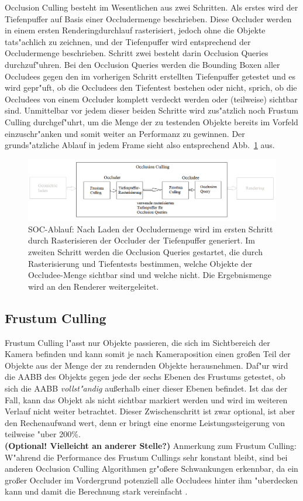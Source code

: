 \documentclass[journal]{vgtc}
\begin{document}
Occlusion Culling besteht im Wesentlichen aus zwei Schritten. Als erstes wird der Tiefenpuffer auf Basis einer Occludermenge beschrieben.
Diese Occluder werden in einem ersten Renderingdurchlauf rasterisiert, jedoch ohne die Objekte tats"achlich zu zeichnen, und der Tiefenpuffer wird entsprechend der Occludermenge beschrieben.
Schritt zwei besteht darin Occlusion Queries durchzuf"uhren.
Bei den Occlusion Queries werden die Bounding Boxen aller Occludees gegen den im vorherigen Schritt erstellten Tiefenpuffer getestet und es wird gepr"uft, ob die Occludees den Tiefentest bestehen oder nicht, sprich, ob die Occludees von einem Occluder komplett verdeckt werden oder (teilweise) sichtbar sind.
Unmittelbar vor jedem dieser beiden Schritte wird zus"atzlich noch Frustum Culling durchgef"uhrt, um die Menge der zu testenden Objekte bereits im Vorfeld einzuschr"anken und somit weiter an Performanz zu gewinnen.
Der grunds"atzliche Ablauf in jedem Frame sieht also entsprechend Abb.\ \ref{fig:socablauf} aus.
\begin{figure}%
\includegraphics[width=\columnwidth]{images/SOCAblauf3.png}%
\caption{SOC-Ablauf: Nach Laden der Occludermenge wird im ersten Schritt durch Rasterisieren der Occluder der Tiefenpuffer generiert. Im zweiten Schritt werden die Occlusion Queries gestartet, die durch Rasterisierung und Tiefentests bestimmen, welche Objekte der Occludee-Menge sichtbar sind und welche nicht. Die Ergebnismenge wird an den Renderer weitergeleitet.}%
\label{fig:socablauf}%
\end{figure}


\subsection{Frustum Culling}
Frustum Culling l"asst nur Objekte passieren, die sich im Sichtbereich der Kamera befinden und kann somit je nach Kameraposition einen gro{\ss}en Teil der Objekte aus der Menge der zu rendernden Objekte herausnehmen.
Daf"ur wird die AABB des Objekts gegen jede der sechs Ebenen des Frustums getestet, ob sich die AABB \textit{vollst"andig} au{\ss}erhalb einer dieser Ebenen befindet.
Ist das der Fall, kann das Objekt als nicht sichtbar markiert werden und wird im weiteren Verlauf nicht weiter betrachtet. Dieser Zwischenschritt ist zwar optional, ist aber den Rechenaufwand wert, denn er bringt eine enorme Leistungssteigerung von teilweise "uber 200\%.\\
\textbf{(Optional! Vielleicht an anderer Stelle?)} Anmerkung zum Frustum Culling: W"ahrend die Performance des Frustum Cullings sehr konstant bleibt, sind bei anderen Occlusion Culling Algorithmen gr"o\ss{}ere Schwankungen erkennbar, da ein gro\ss{}er Occluder im Vordergrund potenziell alle Occludees hinter ihm "uberdecken kann und damit die Berechnung stark vereinfacht \cite{MSOC}.\\
\end{document}
